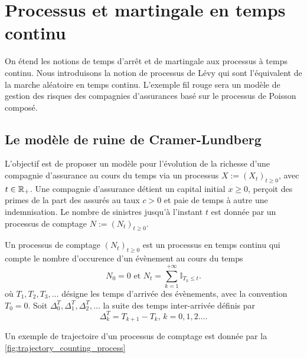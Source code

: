 \chapter{Processus et martingale en temps continu}\label{chap:processus_markov}
On étend les notions de temps d'arrêt et de martingale aux processus à temps continu. Nous introduisons la notion de processus de Lévy qui sont l'équivalent de la marche aléatoire en temps continu. L'exemple fil rouge sera un modèle de gestion des risques des compagnies d'assurances basé sur le processus de Poisson composé. 
\section{Le modèle de ruine de Cramer-Lundberg}\label{sec:cramer-lundberg}
L'objectif est de proposer un modèle pour l'évolution de la richesse d'une compagnie d'assurance au cours du temps via un processus $X:=(X_t)_{t\geq0}$, avec $t\in\mathbb{R}_+$. Une compagnie d'assurance détient un capital initial $x\geq0$, perçoit des primes de la part des assurés au taux $c>0$ et paie de temps à autre une indemnisation. Le nombre de sinistres jusqu'à l'instant $t$ est donnée par un processus de comptage $N:=(N_t)_{t\geq0}$. 
\begin{definition}\label{def:counting_process}
Un processus de comptage $(N_t)_{t\geq0}$ est un processus en temps continu qui compte le nombre d'occurence d'un évènement au cours du temps
\begin{equation*}
N_0=0\text{ et }N_t=\sum_{k=1}^{+\infty}\mathbb{I}_{T_k\leq t}.
\end{equation*}
où $T_1,T_2,T_3,\ldots$ désigne les temps d'arrivée des évènements, avec la convention $T_0=0$. Soit $\Delta^T_0,\Delta^T_1,\Delta^T_2,\ldots$ la suite des temps inter-arrivée définis par
$$
\Delta^T_k=T_{k+1}-T_{k}\text{, }k=0,1,2\ldots.
$$
\end{definition}
Un exemple de trajectoire d'un processus de comptage est donnée par la \cref{fig:trajectory_counting_process}
